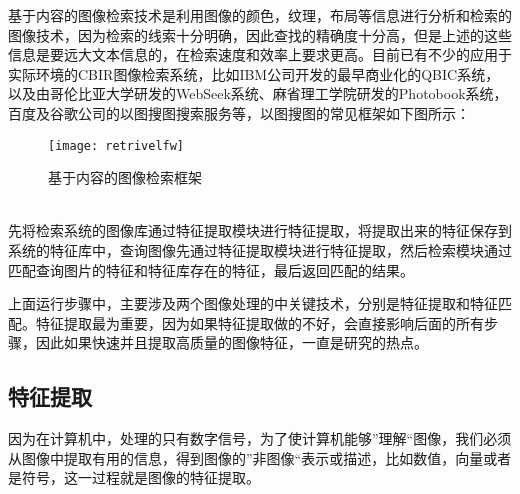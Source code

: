 基于内容的图像检索技术是利用图像的颜色，纹理，布局等信息进行分析和检索的图像技术，因为检索的线索十分明确，因此查找的精确度十分高，但是上述的这些信息是要远大文本信息的，在检索速度和效率上要求更高。目前已有不少的应用于实际环境的CBIR图像检索系统，比如IBM公司开发的最早商业化的QBIC系统，以及由哥伦比亚大学研发的WebSeek系统、麻省理工学院研发的Photobook系统，百度及谷歌公司的以图搜图搜索服务等，以图搜图的常见框架如下图所示：
\begin{figure}[htp]
\centering
\texttt{[image: retrivelfw]}
\caption{基于内容的图像检索框架}
\end{figure}
\\先将检索系统的图像库通过特征提取模块进行特征提取，将提取出来的特征保存到系统的特征库中，查询图像先通过特征提取模块进行特征提取，然后检索模块通过匹配查询图片的特征和特征库存在的特征，最后返回匹配的结果。

上面运行步骤中，主要涉及两个图像处理的中关键技术，分别是特征提取和特征匹配。特征提取最为重要，因为如果特征提取做的不好，会直接影响后面的所有步骤，因此如果快速并且提取高质量的图像特征，一直是研究的热点。

\subsection{特征提取}
因为在计算机中，处理的只有数字信号，为了使计算机能够”理解“图像，我们必须从图像中提取有用的信息，得到图像的”非图像“表示或描述，比如数值，向量或者是符号，这一过程就是图像的特征提取。
